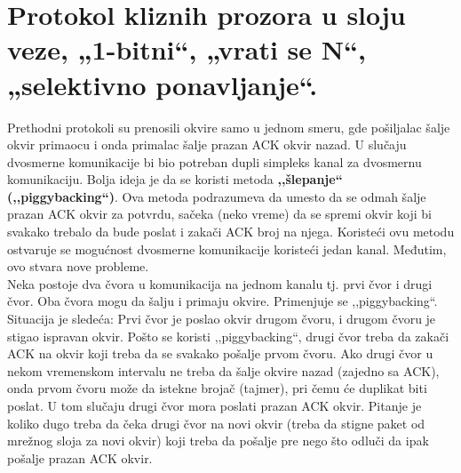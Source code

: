 \documentclass[a4paper]{article}
\begin{document}
\section{Protokol kliznih prozora u sloju veze, „1-bitni“, „vrati se N“, „selektivno ponavljanje“. }
    Prethodni protokoli su prenosili okvire samo u jednom smeru, gde pošiljalac šalje 
    okvir primaocu i onda primalac šalje prazan ACK okvir nazad. U slučaju dvosmerne komunikacije
    bi bio potreban dupli simpleks kanal za dvosmernu komunikaciju. Bolja ideja je da se
    koristi metoda \textbf{,,šlepanje`` (,,piggybacking``)}. Ova metoda podrazumeva da umesto da se odmah šalje
    prazan ACK okvir za potvrdu, sačeka (neko vreme) da se spremi okvir koji bi svakako trebalo da bude
    poslat i zakači ACK broj na njega. Koristeći ovu metodu ostvaruje se mogućnost dvosmerne
    komunikacije koristeći jedan kanal. Međutim, ovo stvara nove probleme. \\
    \indent Neka postoje dva čvora u komunikacija na jednom kanalu tj. prvi čvor i drugi čvor.
    Oba čvora mogu da šalju i primaju okvire. Primenjuje se ,,piggybacking``. Situacija je sledeća:
    Prvi čvor je poslao okvir drugom čvoru, i drugom čvoru je stigao ispravan okvir. Pošto
    se koristi ,,piggybacking``, drugi čvor treba da zakači ACK na okvir koji treba da se
    svakako pošalje prvom čvoru. Ako drugi čvor u nekom vremenskom intervalu ne treba
    da šalje okvire nazad (zajedno sa ACK), onda prvom čvoru može da istekne brojač (tajmer), pri
    čemu će duplikat biti poslat. U tom slučaju drugi čvor mora poslati prazan ACK okvir. Pitanje 
    je koliko dugo treba da čeka drugi čvor na novi okvir (treba da stigne paket od mrežnog sloja za
    novi okvir) koji treba da pošalje pre nego što odluči da ipak pošalje prazan ACK okvir.
\end{document}
